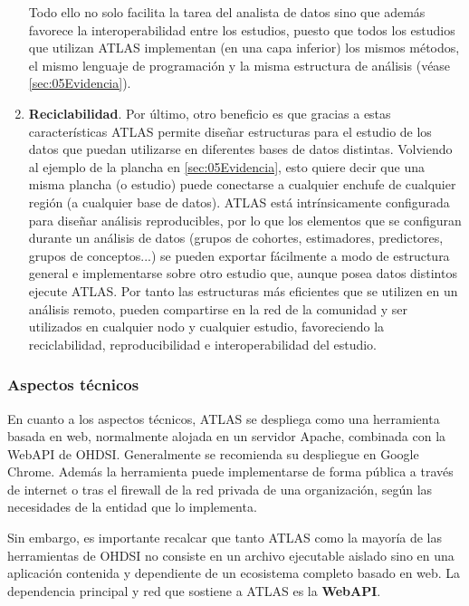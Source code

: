 \begin{enumerate}[label=\roman*.]
     Todo ello no solo facilita la tarea del analista de datos sino que además favorece la interoperabilidad entre los estudios, puesto que todos los estudios que utilizan ATLAS implementan (en una capa inferior) los mismos métodos, el mismo lenguaje de programación y la misma estructura de análisis (véase \ref{sec:05Evidencia}). 

     \item \textbf{Reciclabilidad}. Por último, otro beneficio es que gracias a estas características ATLAS permite diseñar estructuras para el estudio de los datos que puedan utilizarse en diferentes bases de datos distintas. Volviendo al ejemplo de la plancha en \ref{sec:05Evidencia}, esto quiere decir que una misma plancha (o estudio) puede conectarse a cualquier enchufe de cualquier región (a cualquier base de datos). ATLAS está intrínsicamente configurada para diseñar análisis reproducibles, por lo que los elementos que se configuran durante un análisis de datos (grupos de cohortes, estimadores, predictores, grupos de conceptos...) se pueden exportar fácilmente a modo de estructura general e implementarse sobre otro estudio que, aunque posea datos distintos ejecute ATLAS. Por tanto las estructuras más eficientes que se utilizen en un análisis remoto, pueden compartirse en la red de la comunidad y ser utilizados en cualquier nodo y cualquier estudio, favoreciendo la reciclabilidad, reproducibilidad e interoperabilidad del estudio.
    
\end{enumerate}

\subsubsection{Aspectos técnicos}

En cuanto a los aspectos técnicos, ATLAS se despliega como una herramienta basada en web, normalmente alojada en un servidor Apache, combinada con la WebAPI de OHDSI. Generalmente se recomienda su despliegue en Google Chrome. Además la herramienta puede implementarse de forma pública a través de internet o tras el firewall de la red privada de una organización, según las necesidades de la entidad que lo implementa.

Sin embargo, es importante recalcar que tanto ATLAS como la mayoría de las herramientas de OHDSI no consiste en un archivo ejecutable aislado sino en una aplicación contenida y dependiente de un ecosistema completo basado en web. La dependencia principal y red que sostiene a ATLAS es la \textbf{WebAPI}.

